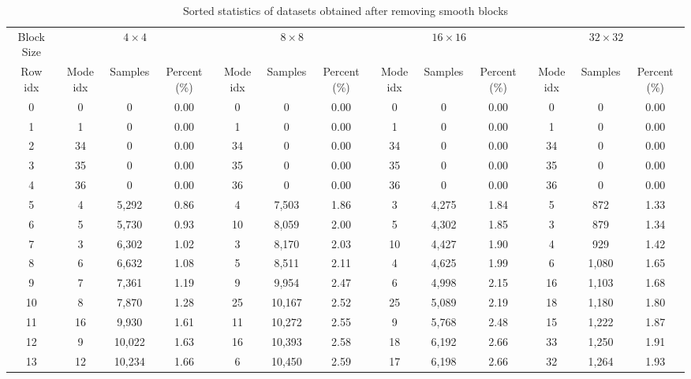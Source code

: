 \begin{table}[H]
    \caption{Sorted statistics of datasets obtained after removing smooth blocks}
    \bigskip\label{tab:sorted-distribution-after-third-step}
    \centering
    \resizebox{\textwidth}{!}
    {\begin{tabular}{c c c c c c c c c c c c c}
        \toprule
        Block Size & \multicolumn{3}{c}{\(4\times4\)} & \multicolumn{3}{c}{\(8\times8\)} & \multicolumn{3}{c}{\(16\times16\)} & \multicolumn{3}{c}{\(32\times32\)} \\
        Row idx  & Mode idx & Samples & Percent (\%) & Mode idx & Samples & Percent (\%) & Mode idx & Samples & Percent (\%) & Mode idx & Samples & Percent (\%)\\
        \midrule
        0 & 0  & 0 &  0.00 & 0  & 0 &  0.00 & 0  & 0 &  0.00 & 0  & 0 &  0.00 \\ 
        1 & 1  & 0 &  0.00 & 1  & 0 &  0.00 & 1  & 0 &  0.00 & 1  & 0 &  0.00 \\ 
        2 & 34  & 0 &  0.00 & 34  & 0 &  0.00 & 34  & 0 &  0.00 & 34  & 0 &  0.00 \\ 
        3 & 35  & 0 &  0.00 & 35  & 0 &  0.00 & 35  & 0 &  0.00 & 35  & 0 &  0.00 \\ 
        4 & 36  & 0 &  0.00 & 36  & 0 &  0.00 & 36  & 0 &  0.00 & 36  & 0 &  0.00 \\ 
        5 & 4  & 5,292 &  0.86 & 4  & 7,503 &  1.86 & 3  & 4,275 &  1.84 & 5  & 872 &  1.33 \\ 
        6 & 5  & 5,730 &  0.93 & 10  & 8,059 &  2.00 & 5  & 4,302 &  1.85 & 3  & 879 &  1.34 \\ 
        7 & 3  & 6,302 &  1.02 & 3  & 8,170 &  2.03 & 10  & 4,427 &  1.90 & 4  & 929 &  1.42 \\ 
        8 & 6  & 6,632 &  1.08 & 5  & 8,511 &  2.11 & 4  & 4,625 &  1.99 & 6  & 1,080 &  1.65 \\ 
        9 & 7  & 7,361 &  1.19 & 9  & 9,954 &  2.47 & 6  & 4,998 &  2.15 & 16  & 1,103 &  1.68 \\ 
       10 & 8  & 7,870 &  1.28 & 25  & 10,167 &  2.52 & 25  & 5,089 &  2.19 & 18  & 1,180 &  1.80 \\ 
       11 & 16  & 9,930 &  1.61 & 11  & 10,272 &  2.55 & 9  & 5,768 &  2.48 & 15  & 1,222 &  1.87 \\ 
       12 & 9  & 10,022 &  1.63 & 16  & 10,393 &  2.58 & 18  & 6,192 &  2.66 & 33  & 1,250 &  1.91 \\ 
       13 & 12  & 10,234 &  1.66 & 6  & 10,450 &  2.59 & 17  & 6,198 &  2.66 & 32  & 1,264 &  1.93 \\ 

\end{tabular}}
\end{table}
